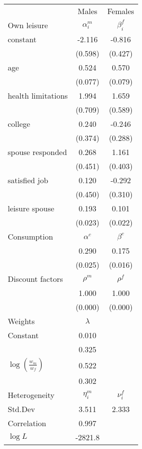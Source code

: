 \begin{tabular}{lcc} 
\hline\hline 
 & Males & Females \\ 
Own leisure & $\alpha_{i}^{m}$ & $\beta_{i}^{f}$ \\ 
constant & -2.116 & -0.816 \\ 
 & (0.598) & (0.427) \\ 
age & 0.524 & 0.570 \\ 
 & (0.077) & (0.079) \\ 
health limitations & 1.994 & 1.659 \\ 
 & (0.709) & (0.589) \\ 
college & 0.240 & -0.246 \\ 
 & (0.374) & (0.288) \\ 
spouse responded & 0.268 & 1.161 \\ 
 & (0.451) & (0.403) \\ 
satisfied job & 0.120 & -0.292 \\ 
 & (0.450) & (0.310) \\ 
leisure spouse & 0.193 & 0.101 \\ 
 & (0.023) & (0.022) \\ 
Consumption & $\alpha^{c}$ & $\beta^{c}$ \\ 
 & 0.290 & 0.175 \\ 
 & (0.025) & (0.016) \\ 
Discount factors & $\rho^m$ & $\rho^f$ \\ 
 & 1.000 & 1.000 \\ 
 & (0.000) & (0.000) \\ 
Weights & $\lambda$ &  \\ 
Constant & 0.010 &  \\ 
 & 0.325 &  \\ 
$\log(\frac{w_m}{w_f})$ & 0.522 &  \\ 
 & 0.302 &  \\ 
Heterogeneity & $\eta_i^m$ & $\nu_i^f$ \\ 
Std.Dev & 3.511 & 2.333 \\ 
Correlation & 0.997 &  \\ 
\hline 
$\log L$ & -2821.8 & \\ 
\hline \hline 
\end{tabular} 
